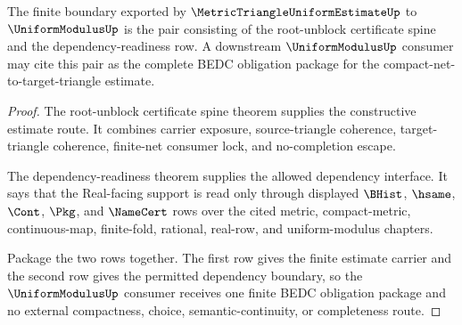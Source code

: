 \begin{theorem}
\label{thm:metric-triangle-uniform-estimate-consumer-boundary-package}
The finite boundary exported by $\MetricTriangleUniformEstimateUp$ to $\UniformModulusUp$ is the pair consisting of the root-unblock certificate spine and the dependency-readiness row. A downstream $\UniformModulusUp$ consumer may cite this pair as the complete BEDC obligation package for the compact-net-to-target-triangle estimate.
\end{theorem}
\begin{proof}
The root-unblock certificate spine theorem supplies the constructive estimate route. It combines carrier exposure, source-triangle coherence, target-triangle coherence, finite-net consumer lock, and no-completion escape.

The dependency-readiness theorem supplies the allowed dependency interface. It says that the Real-facing support is read only through displayed $\BHist$, $\hsame$, $\Cont$, $\Pkg$, and $\NameCert$ rows over the cited metric, compact-metric, continuous-map, finite-fold, rational, real-row, and uniform-modulus chapters.

Package the two rows together. The first row gives the finite estimate carrier and the second row gives the permitted dependency boundary, so the $\UniformModulusUp$ consumer receives one finite BEDC obligation package and no external compactness, choice, semantic-continuity, or completeness route.
\end{proof}

